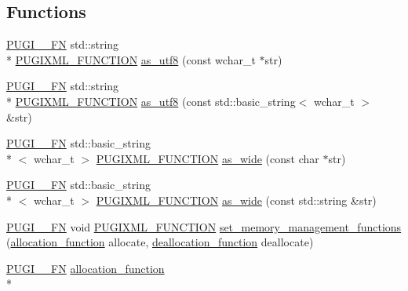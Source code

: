 \subsection*{Functions}
\begin{DoxyCompactItemize}
\item 
\hyperlink{pugixml_8cpp_a82c335af3ca48cdb209c506bf8dd6ad2}{P\-U\-G\-I\-\_\-\-\_\-\-F\-N} std\-::string \\*
\hyperlink{pugixml_8hpp_a3d91f8ab11645e6dac8783d86d152b31}{P\-U\-G\-I\-X\-M\-L\-\_\-\-F\-U\-N\-C\-T\-I\-O\-N} \hyperlink{namespacepugi_a69383a1ee3e92185f93bb2322472d3ce}{as\-\_\-utf8} (const wchar\-\_\-t $\ast$str)
\item 
\hyperlink{pugixml_8cpp_a82c335af3ca48cdb209c506bf8dd6ad2}{P\-U\-G\-I\-\_\-\-\_\-\-F\-N} std\-::string \\*
\hyperlink{pugixml_8hpp_a3d91f8ab11645e6dac8783d86d152b31}{P\-U\-G\-I\-X\-M\-L\-\_\-\-F\-U\-N\-C\-T\-I\-O\-N} \hyperlink{namespacepugi_ab4be9ab3dc86b13599b9f2fd2f778dfb}{as\-\_\-utf8} (const std\-::basic\-\_\-string$<$ wchar\-\_\-t $>$ \&str)
\item 
\hyperlink{pugixml_8cpp_a82c335af3ca48cdb209c506bf8dd6ad2}{P\-U\-G\-I\-\_\-\-\_\-\-F\-N} std\-::basic\-\_\-string\\*
$<$ wchar\-\_\-t $>$ \hyperlink{pugixml_8hpp_a3d91f8ab11645e6dac8783d86d152b31}{P\-U\-G\-I\-X\-M\-L\-\_\-\-F\-U\-N\-C\-T\-I\-O\-N} \hyperlink{namespacepugi_ae372a27a1d2b6a23e431155820fbf166}{as\-\_\-wide} (const char $\ast$str)
\item 
\hyperlink{pugixml_8cpp_a82c335af3ca48cdb209c506bf8dd6ad2}{P\-U\-G\-I\-\_\-\-\_\-\-F\-N} std\-::basic\-\_\-string\\*
$<$ wchar\-\_\-t $>$ \hyperlink{pugixml_8hpp_a3d91f8ab11645e6dac8783d86d152b31}{P\-U\-G\-I\-X\-M\-L\-\_\-\-F\-U\-N\-C\-T\-I\-O\-N} \hyperlink{namespacepugi_af33046c0db1ff7b3f63327d32fc6dca7}{as\-\_\-wide} (const std\-::string \&str)
\item 
\hyperlink{pugixml_8cpp_a82c335af3ca48cdb209c506bf8dd6ad2}{P\-U\-G\-I\-\_\-\-\_\-\-F\-N} void \hyperlink{pugixml_8hpp_a3d91f8ab11645e6dac8783d86d152b31}{P\-U\-G\-I\-X\-M\-L\-\_\-\-F\-U\-N\-C\-T\-I\-O\-N} \hyperlink{namespacepugi_abc67229fed7dbe24a410d83b9233f916}{set\-\_\-memory\-\_\-management\-\_\-functions} (\hyperlink{namespacepugi_a15c8048c4bbfca2ad0ab9fc0b56ea522}{allocation\-\_\-function} allocate, \hyperlink{namespacepugi_aa6161e8d6344110788d7ff8a11ca680b}{deallocation\-\_\-function} deallocate)
\item 
\hyperlink{pugixml_8cpp_a82c335af3ca48cdb209c506bf8dd6ad2}{P\-U\-G\-I\-\_\-\-\_\-\-F\-N} \hyperlink{namespacepugi_a15c8048c4bbfca2ad0ab9fc0b56ea522}{allocation\-\_\-function} \\*

\end{DoxyCompactItemize}

